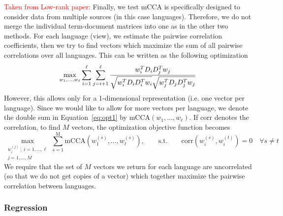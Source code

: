 \documentclass[twoside,11pt]{article}
\newcommand{\oldText}[1]{\textcolor{red}{#1:}\color{blue}}
\begin{document}
{\oldText{Taken from Low-rank paper}
Finally, we test mCCA is specifically designed to consider data from multiple sources (in this case languages). Therefore, we do not merge the individual term-document matrices into one as in
the other two methods. For each language (view), we estimate the pairwise correlation coefficients, then we try to find vectors which maximize the sum of all pairwise correlations over all languages. This can be written as the following optimization 
\begin{equation}
\label{eq:opt1}
\max_{w_1,\ldots, w_\ell} \sum_{i=1}^\ell\sum_{j=i+1}^\ell  \frac{w_i^T D_i D_j^T w_j}{\sqrt{ w_i^T D_i D_i^T w_i\vphantom{ D_j^T } }\sqrt{ w_j^T D_j D_j^T w_j}}
\end{equation}
However, this allows only for a 1-dimensional representation (i.e. one vector per language). Since we would like to allow for more vectors per language, we denote the double sum in Equation~\ref{eq:opt1} by $\mbox{mCCA}(w_1,\ldots,w_\ell)$. If $\mbox{corr}$ denotes the correlation, to find $M$ vectors, the optimization objective function  becomes
\begin{equation}
\max_{\substack{w_i^{(j)}\;;\;i=1,\ldots,\ell\\j=1,\ldots,M }}\sum_{s=1}^{\mbox{M}} \mbox{mCCA}\left(w_1^{(s)},\ldots,w_\ell^{(s)}\right),
\qquad\mbox{s.t.} \qquad \mbox{corr} \left(w_i^{(s)},w_i^{(t)}\right) = 0
\quad \forall s\neq t
\end{equation}
We require that the set of $M$ vectors we return for each language are uncorrelated (so that we do not get copies of a vector) which together maximize the pairwise correlation between languages.
}

\subsubsection{Regression}
\end{document}
